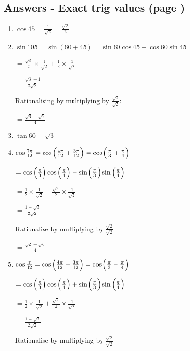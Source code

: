 \documentclass[../main.tex]{subfiles}
\begin{document}
\subsection*{Answers - Exact trig values (page \pageref{Exact trig values})}
\label{Exact trig values answers}
\begin{enumerate}[itemsep=0.4cm]
    \item 
    $\cos{45}=\frac{1}{\sqrt{2}}=\frac{\sqrt{2}}{2}$

    \item 
    $\sin{105}=\sin{(60+45)}=\sin{60}\cos{45}+\cos{60}\sin{45}$

    $=\frac{\sqrt{3}}{2}\times \frac{1}{\sqrt{2}}+\frac{1}{2}\times \frac{1}{\sqrt{2}}$

    $=\frac{\sqrt{3}+1}{2\sqrt{2}}$

    Rationalising by multiplying by $\frac{\sqrt{2}}{\sqrt{2}}$:

    $=\frac{\sqrt{6}+\sqrt{2}}{4}$

    \item 
    $\tan{60}=\sqrt{3}$

    \item 
    $\cos{\frac{7\pi}{12}}=\cos{\Bigl(\frac{4\pi}{12}+\frac{3\pi}{12}\Bigr)}=\cos{\Bigl(\frac{\pi}{3}+\frac{\pi}{4}\Bigr)}$

    $=\cos{\Bigl(\frac{\pi}{3}}\Bigr)\cos{\Bigl(\frac{\pi}{4}}\Bigr)-\sin{\Bigl(\frac{\pi}{3}}\Bigr)\sin{\Bigl(\frac{\pi}{4}}\Bigr)$

    $=\frac{1}{2}\times \frac{1}{\sqrt{2}}-\frac{\sqrt{3}}{2}\times \frac{1}{\sqrt{2}}$

    $=\frac{1-\sqrt{3}}{2\sqrt{2}}$

    Rationalise by multiplying by $\frac{\sqrt{2}}{\sqrt{2}}$

    $=\frac{\sqrt{2}-\sqrt{6}}{4}$

    \item 
    $\cos{\frac{\pi}{12}}=\cos{\Bigl(\frac{4\pi}{12}-\frac{3\pi}{12}\Bigr)}=\cos{\Bigl(\frac{\pi}{3}-\frac{\pi}{4}\Bigr)}$

    $=\cos{\Bigl(\frac{\pi}{3}}\Bigr)\cos{\Bigl(\frac{\pi}{4}}\Bigr)+\sin{\Bigl(\frac{\pi}{3}}\Bigr)\sin{\Bigl(\frac{\pi}{4}}\Bigr)$

    $=\frac{1}{2}\times \frac{1}{\sqrt{2}}+\frac{\sqrt{3}}{2}\times \frac{1}{\sqrt{2}}$

    $=\frac{1+\sqrt{3}}{2\sqrt{2}}$

    Rationalise by multiplying by $\frac{\sqrt{2}}{\sqrt{2}}$


\end{enumerate}
\end{document}
